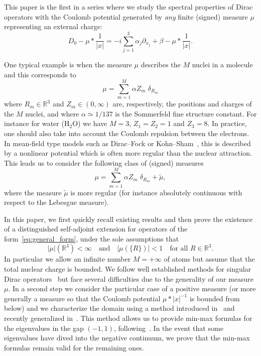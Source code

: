 \documentclass[10pt]{amsart}
\theoremstyle{definition}
\newcommand{\R}{\mathbb{R}}
\newcommand\1{{\ensuremath {\mathds 1} }}
\newcommand{\ii}{\infty}
\begin{document}
This paper is the first in a series where we study the spectral properties of Dirac operators with the Coulomb potential generated by \emph{any} finite (signed) measure $\mu$ representing an external charge:
\begin{equation}\label{eq:general_form}
\boxed{D_0-\mu\ast\frac1{|x|}=-i\sum_{j=1}^3\alpha_j\partial_{x_j}+\beta-\mu\ast\frac1{|x|}.}
\end{equation}

\noindent One typical example is when the measure $\mu$ describes the $M$ nuclei in a molecule and this corresponds to
\[
\mu=\sum_{m=1}^M\alpha Z_m\;\delta_{R_m}
\]
where $R_m\in\R^3$ and $Z_m\in(0,\ii)$ are, respectively, the positions and charges of the $M$ nuclei, and where $\alpha\simeq 1/137$ is the Sommerfeld fine structure constant. For instance for water (H$_2$O) we have $M=3$, $Z_1=Z_2=1$ and $Z_3=8$. In practice, one should also take into account the Coulomb repulsion between the electrons. In mean-field type models such as Dirac--Fock or Kohn--Sham~\cite{EstSer-99}, this is described by a nonlinear potential which is often more regular than the nuclear attraction. This leads us to consider the following class of (signed) measures
\[
\mu=\sum_{m=1}^M\alpha Z_m\;\delta_{R_m}+\widetilde\mu,
\]
where the measure $\widetilde\mu$ is more regular (for instance absolutely continuous with respect to the Lebesgue measure).

In this paper, we first quickly recall existing results and then prove the existence of a distinguished self-adjoint extension for operators of the form~\eqref{eq:general_form}, under the sole assumptions that
\begin{equation}\label{eq:hyp_intro}
|\mu|\left(\R^3\right)<\ii \quad \text{and}\quad \left|\mu(\{R\})\right|<1\quad \text{for all }R\in\R^3.
\end{equation}
In particular we allow an infinite number $M=+\ii$ of atoms but assume that the total nuclear charge is bounded. We follow well established methods for singular Dirac operators~\cite{Kato-83,Klaus-80b,KlaWus-78,Nenciu-76,Nenciu-77,Schmincke-72b,Wust-73,Wust-75,Wust-77} but face several difficulties due to the generality of our measure $\mu$. In a second step we consider the particular case of a positive measure (or more generally a measure so that the Coulomb potential $\mu\ast|x|^{-1}$ is bounded from below) and we characterize the domain using a method introduced in~\cite{EstLos-07, EstLos-08} and recently generalized in~\cite{SchSolTok-20}. This method allows us to provide min-max formulas for the eigenvalues in the gap $(-1,1)$, following~\cite{DolEstSer-00, DolEstSer-00a, DolEstSer-03, DolEstSer-06,EstLewSer-19,GriSie-99, MorMul-15,Muller-16,SchSolTok-20}. In the event that some eigenvalues have dived into the negative continuum, we prove that the min-max formulas remain valid for the remaining ones.
\end{document}

